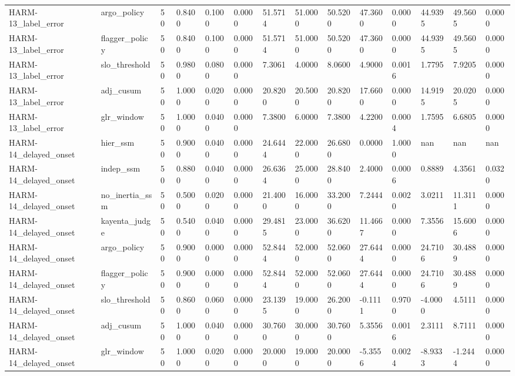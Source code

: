 \begin{table}[htbp]
\begin{tabular}{llllllllllllll}
HARM-13\_label\_error & argo\_policy & 50 & 0.8400 & 0.1000 & 0.0000 & 51.5714 & 51.0000 & 50.5200 & 47.3600 & 0.0000 & 44.9395 & 49.5605 & 0.0000 \\
HARM-13\_label\_error & flagger\_policy & 50 & 0.8400 & 0.1000 & 0.0000 & 51.5714 & 51.0000 & 50.5200 & 47.3600 & 0.0000 & 44.9395 & 49.5605 & 0.0000 \\
HARM-13\_label\_error & slo\_threshold & 50 & 0.9800 & 0.0800 & 0.0000 & 7.3061 & 4.0000 & 8.0600 & 4.9000 & 0.0016 & 1.7795 & 7.9205 & 0.0000 \\
HARM-13\_label\_error & adj\_cusum & 50 & 1.0000 & 0.0200 & 0.0000 & 20.8200 & 20.5000 & 20.8200 & 17.6600 & 0.0000 & 14.9195 & 20.0205 & 0.0000 \\
HARM-13\_label\_error & glr\_window & 50 & 1.0000 & 0.0400 & 0.0000 & 7.3800 & 6.0000 & 7.3800 & 4.2200 & 0.0004 & 1.7595 & 6.6805 & 0.0000 \\
HARM-14\_delayed\_onset & hier\_ssm & 50 & 0.9000 & 0.0400 & 0.0000 & 24.6444 & 22.0000 & 26.6800 & 0.0000 & 1.0000 & nan & nan & nan \\
HARM-14\_delayed\_onset & indep\_ssm & 50 & 0.8800 & 0.0400 & 0.0000 & 26.6364 & 25.0000 & 28.8400 & 2.4000 & 0.0006 & 0.8889 & 4.3561 & 0.0320 \\
HARM-14\_delayed\_onset & no\_inertia\_ssm & 50 & 0.5000 & 0.0200 & 0.0000 & 21.4000 & 16.0000 & 33.2000 & 7.2444 & 0.0020 & 3.0211 & 11.3111 & 0.0000 \\
HARM-14\_delayed\_onset & kayenta\_judge & 50 & 0.5400 & 0.0400 & 0.0000 & 29.4815 & 23.0000 & 36.6200 & 11.4667 & 0.0000 & 7.3556 & 15.6006 & 0.0000 \\
HARM-14\_delayed\_onset & argo\_policy & 50 & 0.9000 & 0.0000 & 0.0000 & 52.8444 & 52.0000 & 52.0600 & 27.6444 & 0.0000 & 24.7106 & 30.4889 & 0.0000 \\
HARM-14\_delayed\_onset & flagger\_policy & 50 & 0.9000 & 0.0000 & 0.0000 & 52.8444 & 52.0000 & 52.0600 & 27.6444 & 0.0000 & 24.7106 & 30.4889 & 0.0000 \\
HARM-14\_delayed\_onset & slo\_threshold & 50 & 0.8600 & 0.0600 & 0.0000 & 23.1395 & 19.0000 & 26.2000 & -0.1111 & 0.9700 & -4.0000 & 4.5111 & 0.0000 \\
HARM-14\_delayed\_onset & adj\_cusum & 50 & 1.0000 & 0.0400 & 0.0000 & 30.7600 & 30.0000 & 30.7600 & 5.3556 & 0.0016 & 2.3111 & 8.7111 & 0.0000 \\
HARM-14\_delayed\_onset & glr\_window & 50 & 1.0000 & 0.0200 & 0.0000 & 20.0000 & 19.0000 & 20.0000 & -5.3556 & 0.0024 & -8.9333 & -1.2444 & 0.0000 \\
\hline
\end{tabular}
\end{table}
